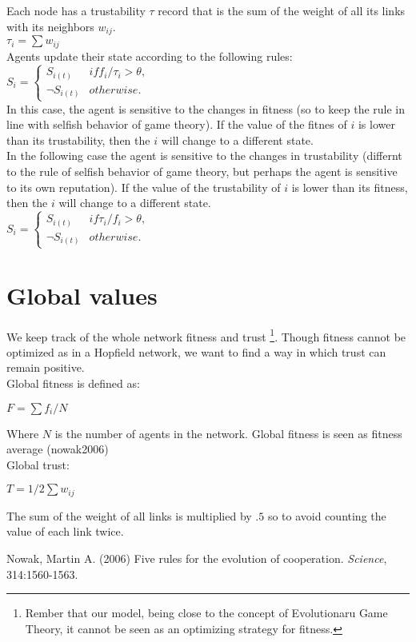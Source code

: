 \documentclass[11pt]{article}
\begin{document}
Each node has a trustability $\tau$ record that is the sum of the weight of all its links with its neighbors $w_{ij}$.\\

$\tau_{i} = \sum w_{ij}$\\

Agents update their state according to the following rules:\\

$S_{i} = \begin{cases} S_{i(t)} & if  f_{i}/\tau_{i} > \theta,\\
\neg S_{i(t)} &  otherwise. \end{cases} $\\

In this case, the agent is sensitive to the changes in fitness (so to keep the rule in line with selfish behavior of game theory). If the value of the fitnes of $i$ is lower than its trustability, then the $i$ will change to a different state.\\

In the following case the agent is sensitive to the changes in trustability (differnt to the rule of selfish behavior of game theory, but perhaps the agent is sensitive to its own reputation). If the value of the trustability of $i$ is lower than its fitness, then the $i$ will change to a different state.\\

$S_{i} = \begin{cases} S_{i(t)} & if  \tau_{i}/f_{i} > \theta,\\
\neg S_{i(t)} &  otherwise. \end{cases} $\\

\section{Global values}

We keep track of the whole network fitness and trust \footnote{Rember that our model, being close to the concept of Evolutionaru Game Theory, it cannot be seen as an optimizing strategy for fitness.}. Though fitness cannot be optimized as in a Hopfield network, we want to find a way in which trust can remain positive.\\

Global fitness is defined as:

$F = \sum f_{i}/N$

Where $N$ is the number of agents in the network. Global fitness is seen as fitness average (nowak2006)\\


Global trust:

$T = 1/2 \sum w_{ij}$

The sum of the weight of all links is multiplied by $.5$ so to avoid counting the value of each link twice.\\


\begin{thebibliography}{30}

 Nowak, Martin A. (2006) Five rules for the evolution of cooperation. \textit{Science}, 314:1560-1563.

\end{thebibliography}
\end{document}
